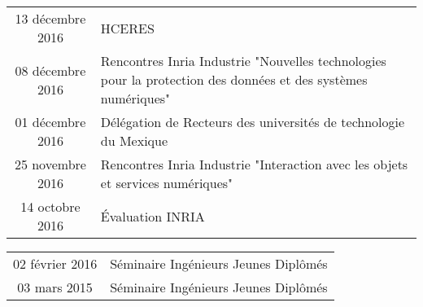 \documentclass[]{deedy-resume-openfont}
\begin{document}
\descript{}
\begin{tabular}{cp{150mm}}
13 décembre 2016       & HCERES\\
08 décembre 2016       & Rencontres Inria Industrie "Nouvelles technologies pour la protection des données et des systèmes numériques"\\
01 décembre 2016       & Délégation de Recteurs des universités de technologie du Mexique\\
25 novembre 2016       & Rencontres Inria Industrie "Interaction avec les objets et services numériques"\\
14 octobre 2016        & Évaluation INRIA\\
\end{tabular}
\sectionsep

\descript{}
\begin{tabular}{cl}
02 février 2016        & Séminaire Ingénieurs Jeunes Diplômés\\
03 mars 2015           & Séminaire Ingénieurs Jeunes Diplômés\\
\end{tabular}
\sectionsep


\end{document}
